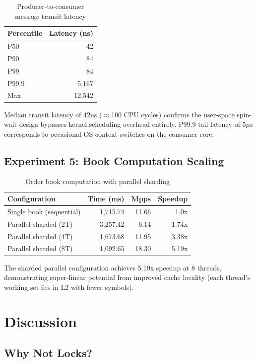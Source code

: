 \documentclass[conference]{IEEEtran}
\begin{document}
\begin{table}[H]
\centering
\caption{Producer-to-consumer message transit latency}
\begin{tabular}{lr}
\toprule
Percentile & Latency (ns) \\
\midrule
P50 & 42 \\
P90 & 84 \\
P99 & 84 \\
P99.9 & 5,167 \\
Max & 12,542 \\
\bottomrule
\end{tabular}
\label{tab:latency}
\end{table}

Median transit latency of 42ns ($\approx$100 CPU cycles) confirms the user-space spin-wait design bypasses kernel scheduling overhead entirely. P99.9 tail latency of 5$\mu$s corresponds to occasional OS context switches on the consumer core.

\subsection{Experiment 5: Book Computation Scaling}

\begin{table}[H]
\centering
\caption{Order book computation with parallel sharding}
\begin{tabular}{lrrr}
\toprule
Configuration & Time (ms) & Mpps & Speedup \\
\midrule
Single book (sequential) & 1,715.74 & 11.66 & 1.0x \\
Parallel sharded (2T) & 3,257.42 & 6.14 & 1.74x \\
Parallel sharded (4T) & 1,673.68 & 11.95 & 3.38x \\
Parallel sharded (8T) & 1,092.65 & 18.30 & 5.19x \\
\bottomrule
\end{tabular}
\label{tab:book}
\end{table}

The sharded parallel configuration achieves 5.19x speedup at 8 threads, demonstrating super-linear potential from improved cache locality (each thread's working set fits in L2 with fewer symbols).

\section{Discussion}

\subsection{Why Not Locks?}
\end{document}
